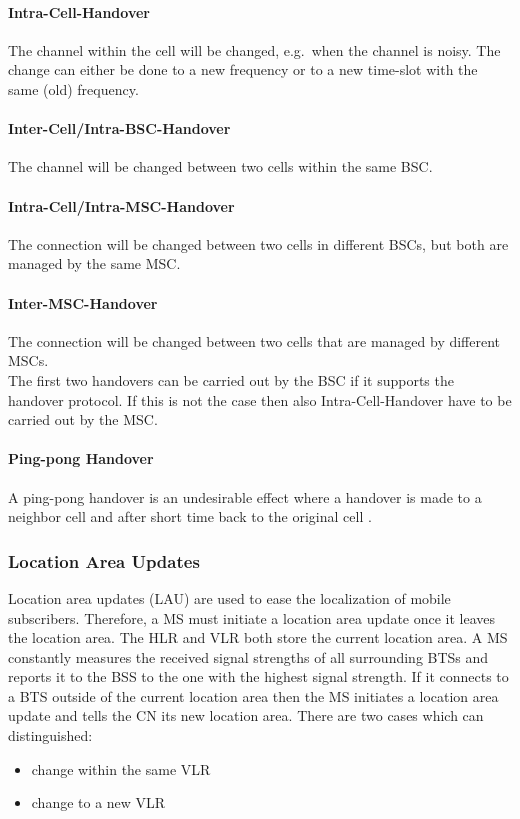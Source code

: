 \documentclass[master,english]{hgbthesis}
\begin{document}
\paragraph{Intra-Cell-Handover} The channel within the cell will be changed, e.g.\ when the channel is noisy. The change can either be done to a new frequency or to a new time-slot with the same (old) frequency.
\paragraph{Inter-Cell/Intra-BSC-Handover}
The channel will be changed between two cells within the same BSC.
\paragraph{Intra-Cell/Intra-MSC-Handover}
The connection will be changed between two cells in different BSCs, but both are managed by the same MSC.
\paragraph{Inter-MSC-Handover}
The connection will be changed between two cells that are managed by different MSCs.
\\
The first two handovers can be carried out by the BSC if it supports the handover protocol. If this is not the case then also Intra-Cell-Handover have to be carried out by the MSC.
\paragraph{Ping-pong Handover}
A ping-pong handover is an undesirable effect where a handover is made to a neighbor cell and after short time back to the original cell \cite{Junius1995}.
\subsubsection{Location Area Updates}
Location area updates (LAU) are used to ease the localization of mobile subscribers. Therefore, a MS must initiate a location area update once it leaves the location area. The HLR and VLR both store the current location area. A MS constantly measures the received signal strengths of all surrounding BTSs and reports it to the BSS to the one with the highest signal strength. If it connects to a BTS outside of the current location area then the MS initiates a location area update and tells the CN its new location area.
There are two cases which can distinguished:
\begin{itemize}
	\item change within the same VLR
	\item change to a new VLR
\end{itemize}
\end{document}
